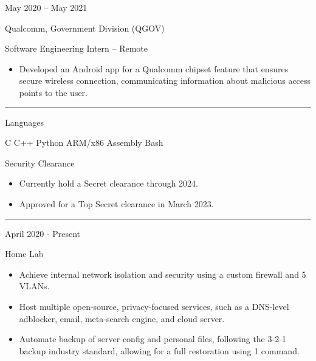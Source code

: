 \documentclass[a4paper]{article}
\newlength{\cvcolumngapwidth}
\newlength{\cvleftcolumnwidth}
\newlength{\cvrightcolumnwidth}
\newcommand{\cvsectionstyle}[1]{{\normalsize\cvsectionfont\textcolor{cvsectioncolor}{#1}}}
\newcommand{\cvtitlestyle}[1]{{\large\cvtitlefont\textcolor{cvtitlecolor}{#1}}}
\newcommand{\cvdurationstyle}[1]{{\small\cvdurationfont\textcolor{cvdurationcolor}{#1}}}
\newcommand{\italicstyle}[1]{{\small\italicfont\textcolor{cvsectioncolor}{#1}}}
\newlength{\cvafteritemskipamount}
\newlength{\cvaftersectionskipamount}
\newlength{\cvbeforesectionskipamount}
\newlength{\cvaftertitleskipamount}
\newlength{\cvparskip}
\newcommand{\cvsection}[1]{
    \vspace{\cvbeforesectionskipamount}

    \begin{minipage}[t]{\cvleftcolumnwidth}
        \raggedleft\cvsectionstyle{#1}
    \end{minipage}%
    \hspace{\cvcolumngapwidth}%
    \begin{minipage}[t]{\cvrightcolumnwidth}
        \textcolor{cvrulecolor}{\rule{\cvrightcolumnwidth}{0.3mm}}
    \end{minipage}

    \vspace{\cvaftersectionskipamount}
}
\newcommand{\cvitem}[2]{
    \begin{minipage}[t]{\cvleftcolumnwidth}
        \raggedleft #1
    \end{minipage}%
    \hspace{\cvcolumngapwidth}%
    \begin{minipage}[t]{\cvrightcolumnwidth}
        \setlength{\parskip}{\cvparskip} #2
    \end{minipage}

    \vspace{\cvafteritemskipamount}
}
\newcommand{\cvtitle}[1]{
    \cvtitlestyle{#1}

    \vspace{\cvaftertitleskipamount}
    \vspace{-\cvparskip}
}
\begin{document}
\vspace{6mm}

\cvitem{
    \cvdurationstyle{May 2020 -- May 2021}
}{
    \cvtitle{Qualcomm, Government Division (QGOV)}

    \italicstyle{Software Engineering Intern -- Remote}

    \normalsize
    \begin{itemize}[leftmargin=*]
        \item Developed an Android app for a Qualcomm chipset feature that ensures secure wireless connection,
          communicating information about malicious access points to the user.
    \end{itemize}
}


\cvsection{\LARGE \textcolor{emphasiscolor}{EXPERTISE}}

\cvitem{
    \cvdurationstyle{Languages}
}{
  C \hfill C++ \hfill Python \hfill ARM/x86 Assembly \hfill Bash
}

\vspace{6mm}

\cvitem{
    \cvdurationstyle{Security Clearance}
}{
    \begin{itemize}[leftmargin=*]
      \item Currently hold a Secret clearance through 2024.
      \item Approved for a Top Secret clearance in March 2023.
    \end{itemize}
}


\cvsection{\LARGE \textcolor{emphasiscolor}{INTERESTS}}

\cvitem{
    \cvdurationstyle{April 2020 - Present}
}{
  \cvtitle{Home Lab}

    \begin{itemize}[leftmargin=*]
        \item Achieve internal network isolation and security using a custom firewall and 5 VLANs.
        \item Host multiple open-source, privacy-focused services, such as a DNS-level adblocker, email, meta-search engine, and cloud server.
        \item Automate backup of server config and personal files, following the 3-2-1 backup industry standard, allowing for a full restoration using 1 command.
    \end{itemize}
}
\end{document}
